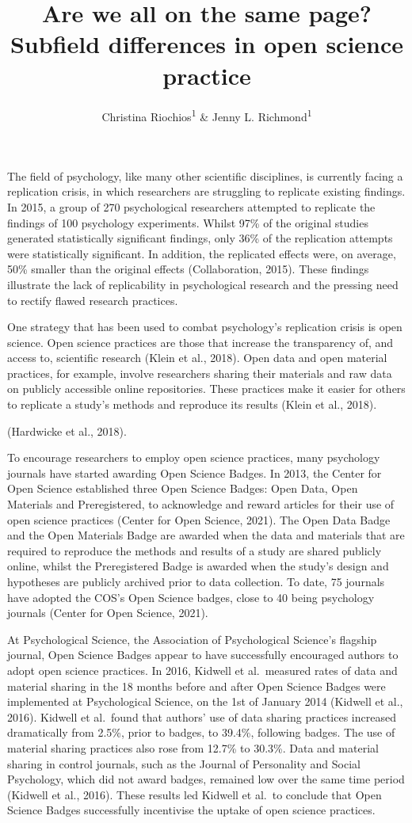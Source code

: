 \documentclass[
  english,
  man]{apa6}
\title{Are we all on the same page? Subfield differences in open science practice}
\author{Christina Riochios\textsuperscript{1} \& Jenny L. Richmond\textsuperscript{1}}
\date{}
\affiliation{\vspace{0.5cm}\textsuperscript{1} University of New South Wales}
\begin{document}
\maketitle

The field of psychology, like many other scientific disciplines, is currently facing a replication crisis, in which researchers are struggling to replicate existing findings. In 2015, a group of 270 psychological researchers attempted to replicate the findings of 100 psychology experiments. Whilst 97\% of the original studies generated statistically significant findings, only 36\% of the replication attempts were statistically significant. In addition, the replicated effects were, on average, 50\% smaller than the original effects (Collaboration, 2015). These findings illustrate the lack of replicability in psychological research and the pressing need to rectify flawed research practices.

One strategy that has been used to combat psychology's replication crisis is open science. Open science practices are those that increase the transparency of, and access to, scientific research (Klein et al., 2018). Open data and open material practices, for example, involve researchers sharing their materials and raw data on publicly accessible online repositories. These practices make it easier for others to replicate a study's methods and reproduce its results (Klein et al., 2018).

(Hardwicke et al., 2018).

To encourage researchers to employ open science practices, many psychology journals have started awarding Open Science Badges. In 2013, the Center for Open Science established three Open Science Badges: Open Data, Open Materials and Preregistered, to acknowledge and reward articles for their use of open science practices (Center for Open Science, 2021). The Open Data Badge and the Open Materials Badge are awarded when the data and materials that are required to reproduce the methods and results of a study are shared publicly online, whilst the Preregistered Badge is awarded when the study's design and hypotheses are publicly archived prior to data collection. To date, 75 journals have adopted the COS's Open Science badges, close to 40 being psychology journals (Center for Open Science, 2021).

At Psychological Science, the Association of Psychological Science's flagship journal, Open Science Badges appear to have successfully encouraged authors to adopt open science practices. In 2016, Kidwell et al.~measured rates of data and material sharing in the 18 months before and after Open Science Badges were implemented at Psychological Science, on the 1st of January 2014 (Kidwell et al., 2016). Kidwell et al.~found that authors' use of data sharing practices increased dramatically from 2.5\%, prior to badges, to 39.4\%, following badges. The use of material sharing practices also rose from 12.7\% to 30.3\%. Data and material sharing in control journals, such as the Journal of Personality and Social Psychology, which did not award badges, remained low over the same time period (Kidwell et al., 2016). These results led Kidwell et al.~to conclude that Open Science Badges successfully incentivise the uptake of open science practices.
\end{document}
